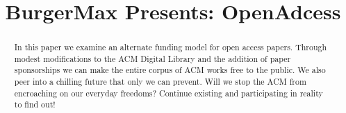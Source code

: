 \documentclass[sigtbd]{sigtbd17-style}
\begin{document}
\title{BurgerMax Presents: OpenAdcess}
\maketitle

\begin{abstract}
  In this paper we examine an alternate funding model for open access papers.
  Through modest modifications to the ACM Digital Library and the addition of
  paper sponsorships we can make the entire corpus of ACM works free to the
  public.
  We also peer into a chilling future that only we can prevent.
  Will we stop the ACM from encroaching on our everyday freedoms?
  Continue existing and participating in reality to find out!
\end{abstract}













{}

\end{document}

